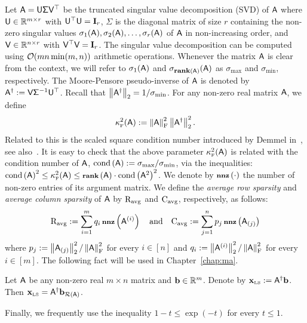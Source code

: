 %
Let $\matA = \matU\matSig \matV^\top$ be the truncated singular value decomposition (SVD) of $\matA$ where $\matU\in\RR^{m\times r}$ with $\matU^\top \matU = \Id_r$, $\Sigma$ is the diagonal matrix of size $r$ containing the non-zero singular values $\sigma_1(\matA),\sigma_2(\matA),\ldots , \sigma_r(\matA)$ of $\matA$ in non-increasing order, and $\matV\in\RR^{n\times r}$ with $\matV^\top \matV = \Id_r$. The singular value decomposition can be computed using $\OO(mn\min (m,n))$ arithmetic operations. Whenever the matrix $\matA$ is clear from the context, we will refer to $\sigma_1(\matA)$ and $\sigma_{\rank{\matA}}(\matA)$ as $\sigma_{\max}$ and $\sigma_{\min}$, respectively. The Moore-Pensore pseudo-inverse of $\matA$ is denoted by $\pinv{\matA}:= \matV \matSig^{-1}\matU^\top$. Recall that $\norm{\pinv{\matA}} = 1/\sigma_{\min}$.
For any non-zero real matrix $\matA$, we define
\begin{equation}\label{eq:kappa}
\kappaFS(\matA) := \frobnorm{\matA}^2 \norm{\pinv{\matA}}^2.
\end{equation}
Related to this is the scaled square condition number introduced by Demmel in~\cite{cond:Demmel}, see also~\cite{RK}. It is easy to check that the above parameter $\kappaFS(\matA)$ is related with the condition number of $\matA$, $\cond{\matA}:= \sigma_{\max} / \sigma_{\min}$, via the inequalities: $\cond{\matA}^2 \leq \kappaFS(\matA) \leq \rank{\matA} \cdot \cond{\matA^2}^2$. We denote by $\nnz{\cdot}$ the number of non-zero entries of its argument matrix. We define the \emph{average row sparsity} and \emph{average column sparsity} of $\matA$ by $\ravg$ and $\cavg$, respectively, as follows:
\[	\ravg := \sum_{i=1}^{m} q_i \nnz{\ar{i}}\quad\text{and}\quad \cavg := \sum_{j=1}^{n} p_{j} \nnz{\ac{j}}\]
where $p_j := \norm{\ac{j}}^2 / \frobnorm{\matA}^2$ for every $i\in{[n]}$ and $q_i := \norm{\ar{i}}^2 / \frobnorm{\matA}^2$ for every $i\in{[m]}$. The following fact will be used in Chapter~\ref{chap:ma}.
%
\begin{fact}\label{fact:xls}
Let $\matA$ be any non-zero real $m\times n$ matrix and $\b\in\RR^m$. Denote by $\xls:= \pinv{\matA}\b$. Then $\xls = \pinv{\matA}\br$.
\end{fact}
%
Finally, we frequently use the inequality $1-t\leq \exp(-t)$ for every $t\leq 1$.
%

